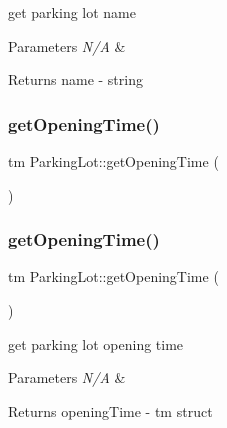 get parking lot name 


\begin{DoxyParams}{Parameters}
{\em N/A} & \\
\hline
\end{DoxyParams}
\begin{DoxyReturn}{Returns}
name -\/ string 
\end{DoxyReturn}
\mbox{\label{class_parking_lot_a08f4debc52d08ef0050c81e18a5759e5}} 
\subsubsection{\texorpdfstring{get\+Opening\+Time()}{getOpeningTime()}\hspace{0.1cm}{\footnotesize\ttfamily [1/2]}}
{\footnotesize\ttfamily tm Parking\+Lot\+::get\+Opening\+Time (\begin{DoxyParamCaption}{ }\end{DoxyParamCaption})}

\mbox{\label{class_parking_lot_a08f4debc52d08ef0050c81e18a5759e5}} 
\subsubsection{\texorpdfstring{get\+Opening\+Time()}{getOpeningTime()}\hspace{0.1cm}{\footnotesize\ttfamily [2/2]}}
{\footnotesize\ttfamily tm Parking\+Lot\+::get\+Opening\+Time (\begin{DoxyParamCaption}{ }\end{DoxyParamCaption})}



get parking lot opening time 


\begin{DoxyParams}{Parameters}
{\em N/A} & \\
\hline
\end{DoxyParams}
\begin{DoxyReturn}{Returns}
opening\+Time -\/ tm struct 
\end{DoxyReturn}
\mbox{\label{class_parking_lot_abd4aba799c6f13e467ed0b5e17ef70eb}} 
